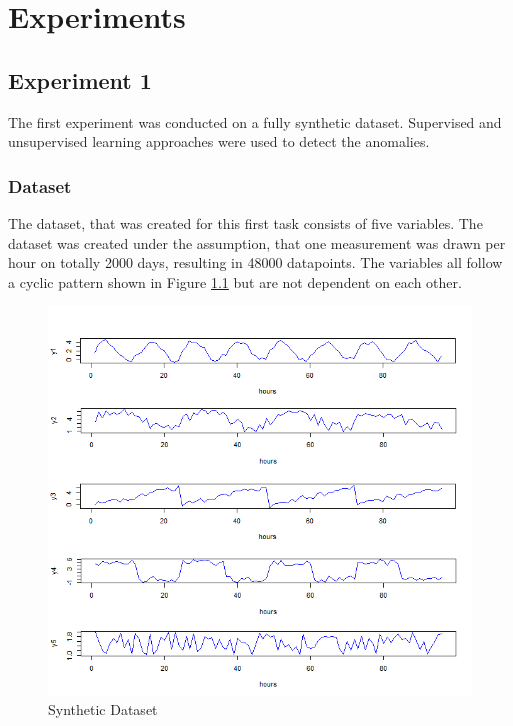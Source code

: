 \chapter{Experiments} \label{Experiments}
 
\section{Experiment 1}
The first experiment was conducted on a fully synthetic dataset. Supervised and unsupervised learning approaches were used to detect the anomalies. 

\subsection{Dataset} \label{dataset1}
The dataset, that was created for this first task consists of five variables. The dataset was created under the assumption, that one measurement was drawn per hour on totally 2000 days, resulting in 48000 datapoints. The variables all follow a cyclic pattern shown in Figure \ref{fig:synthetic data} but are not dependent on each other. 

\begin{figure}[h]
	\centering
	\includegraphics[scale=0.7]{Figures/synthetic data}
	\decoRule
	\caption[Synthetic Dataset]{Synthetic Dataset \parencite{own}}
	\label{fig:synthetic data}
\end{figure}

